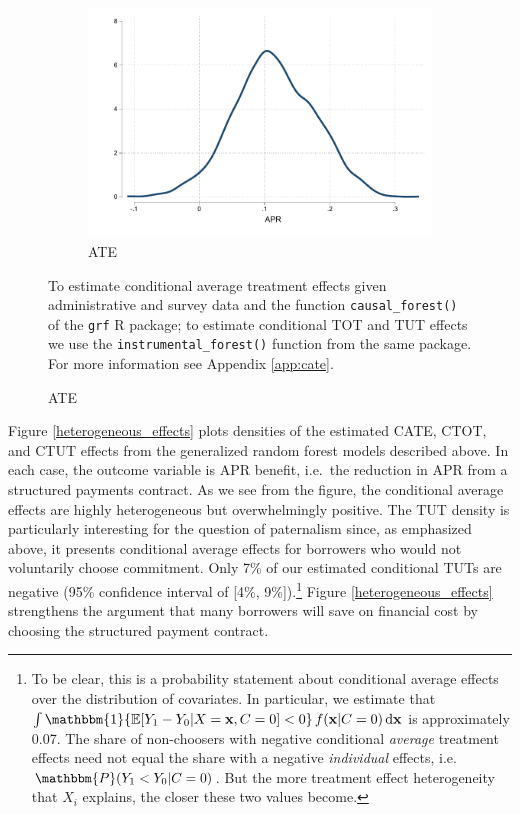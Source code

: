 \documentclass[12pt, a4paper]{article}
\begin{document}
\begin{figure}[!h]
\begin{center}
\begin{subfigure}{.35\textwidth}
        \includegraphics[width=\textwidth]{Figuras/he_dist_tau_hat_eff.pdf}
        \caption{ATE}
    \end{subfigure} 
    \end{center}
  \scriptsize{To estimate conditional average treatment effects given administrative and survey data and the function \texttt{causal\_forest()} of the \texttt{grf} R package; to estimate conditional TOT and TUT effects we use the \texttt{instrumental\_forest()} function from the same package. For more information see Appendix \ref{app:cate}.} 
\end{figure}


Figure \ref{heterogeneous_effects} plots densities of the estimated CATE, CTOT, and CTUT effects from the generalized random forest models described above.
In each case, the outcome variable is APR benefit, i.e.\ the reduction in APR from a structured payments contract.
As we see from the figure, the conditional average effects are highly heterogeneous but overwhelmingly positive. 
The TUT density is particularly interesting for the question of paternalism since, as emphasized above, it presents conditional average effects for borrowers who would not voluntarily choose commitment.
Only 7\% of our estimated conditional TUTs are negative (95\% confidence interval of [4\%, 9\%]).\footnote{To be clear, this is a probability statement about conditional average effects over the distribution of covariates.
In particular, we estimate that  $\int \mathbbm{1}\{\mathbb{E}[Y_1 - Y_0| X = \mathbf{x}, C = 0] < 0\} \, f(\mathbf{x}|C=0) \, \mathrm{d}\mathbf{x}$ is approximately 0.07. The share of non-choosers with negative conditional \emph{average} treatment effects need not equal the share with a negative \emph{individual} effects, i.e.\ $\mathbbm{P}(Y_1 < Y_0| C = 0)$.
But the more treatment effect heterogeneity that $X_i$ explains, the closer these two values become.}
Figure \ref{heterogeneous_effects} strengthens the argument that many borrowers will save on financial cost by choosing the structured payment contract.
\end{document}
